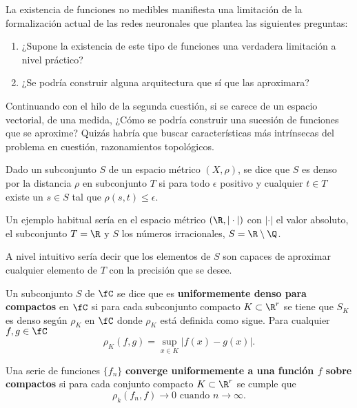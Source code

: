 La existencia de funciones no medibles manifiesta una limitación
de la formalización actual de las redes neuronales que plantea las siguientes 
preguntas: 
\begin{enumerate}
    \item ¿Supone la existencia de este tipo de funciones una verdadera limitación a nivel práctico?
    \item ¿Se podría construir alguna arquitectura que sí que las aproximara?
\end{enumerate}  

Continuando con el hilo de la segunda cuestión, si se carece de un espacio vectorial, 
de una medida,  ¿Cómo se podría construir una sucesión de funciones que se aproxime?
Quizás habría que buscar características más intrínsecas del problema en cuestión, 
razonamientos topológicos.

\begin{definicion}  
    Dado un subconjunto $S$ de un espacio métrico $(X, \rho)$, se dice que $S$ es denso por la distancia $\rho$
    en subconjunto $T$ si para todo $\epsilon$ positivo y cualquier $t \in T$ existe un $s \in S$ tal 
    que $\rho(s,t) \leq \epsilon$. 
\end{definicion}

Un ejemplo habitual sería en el espacio métrico $(\R, |\cdot|)$ con $|\cdot|$ el valor absoluto, el subconjunto 
$T = \R$ y $S$ los números irracionales, $S = \R \setminus \Q$. 

A nivel intuitivo sería decir que los elementos de $S$ son capaces de aproximar cualquier elemento de $T$
con la precisión que se desee. 

\begin{definicion} 
    Un subconjunto $S$ de $\fC$ se dice que es \textbf{uniformemente denso para compactos} en  $\fC$
    si para cada subconjunto compacto $K \subset \R^r$ se tiene que $S_K$ es denso según $\rho_K$ en $\fC$
    donde $\rho_K$ está definida como sigue.
    Para cualquier $f,g \in \fC$ 
    \begin{equation}
        \rho _ K (f,g) = \sup_{x \in K} |f(x) - g(x)|.
    \end{equation}
\end{definicion}

\begin{definicion}
    Una serie de funciones $\{f_n\}$ \textbf{converge uniformemente a una función $f$ sobre compactos} si para 
    cada  conjunto compacto $K \subset \R^r$  se cumple que
    \begin{equation}
        \rho_k (f_n, f) \longrightarrow 0 \text{ cuando } n \longrightarrow \infty.
    \end{equation} 
\end{definicion}

